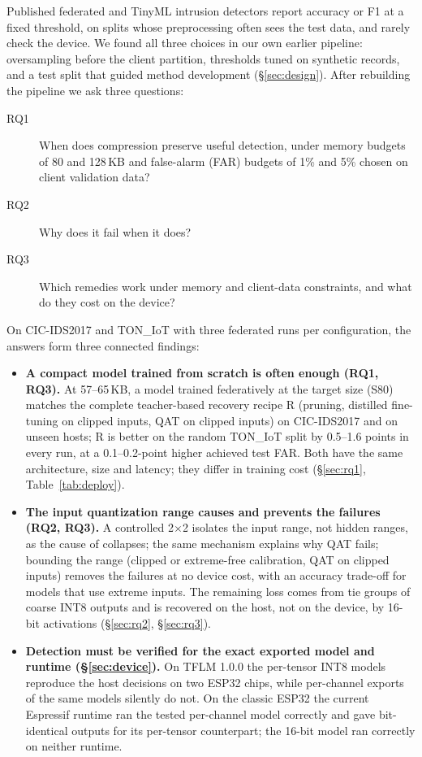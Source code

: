 \documentclass[sigplan,10pt,review,anonymous,nonacm]{acmart}
\newcommand{\cic}{CIC-IDS2017\xspace}
\newcommand{\ton}{TON\_IoT\xspace}
\begin{document}
Published federated and TinyML intrusion detectors report accuracy or F1 at a fixed threshold, on
splits whose preprocessing often sees the test data, and rarely check the device. We found all three
choices in our own earlier pipeline: oversampling before the client partition, thresholds tuned on
synthetic records, and a test split that guided method development (\S\ref{sec:design}). After
rebuilding the pipeline we ask three questions:
\begin{description}
\item[RQ1] When does compression preserve useful detection, under memory budgets of 80 and 128\,KB
  and false-alarm (FAR) budgets of 1\% and 5\% chosen on client validation data?
\item[RQ2] Why does it fail when it does?
\item[RQ3] Which remedies work under memory and client-data constraints, and what do they cost on the device?
\end{description}
On \cic and \ton with three federated runs per configuration, the answers form three connected findings:
\begin{itemize}
\item \textbf{A compact model trained from scratch is often enough (RQ1, RQ3).} At 57--65\,KB, a model
  trained federatively at the target size (S80) matches the complete teacher-based recovery recipe R
  (pruning, distilled fine-tuning on clipped inputs, QAT on clipped inputs) on \cic and on unseen hosts;
  R is better on the random \ton split by 0.5--1.6 points in every run, at a 0.1--0.2-point higher
  achieved test FAR. Both have the same architecture, size and latency; they differ in training cost
  (\S\ref{sec:rq1}, Table~\ref{tab:deploy}).
\item \textbf{The input quantization range causes and prevents the failures (RQ2, RQ3).} A controlled
  2$\times$2 isolates the input range, not hidden ranges, as the cause of collapses; the same mechanism
  explains why QAT fails; bounding the range (clipped or extreme-free calibration, QAT on clipped inputs)
  removes the failures at no device cost, with an accuracy trade-off for models that use extreme
  inputs. The remaining loss comes from tie groups of coarse INT8 outputs and is recovered on the
  host, not on the device, by 16-bit activations (\S\ref{sec:rq2}, \S\ref{sec:rq3}).
\item \textbf{Detection must be verified for the exact exported model and runtime (\S\ref{sec:device}).}
  On TFLM 1.0.0 the per-tensor INT8 models reproduce the host decisions on two ESP32 chips, while
  per-channel exports of the same models silently do not. On the classic ESP32 the current Espressif
  runtime ran the tested per-channel model correctly and gave bit-identical outputs for its per-tensor
  counterpart; the 16-bit model ran correctly on neither runtime.
\end{itemize}
\end{document}
